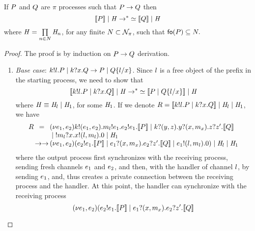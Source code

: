 \begin{lemma}\label{lem:oper-corresp-with-Hs-completeness}
If $P$ and $Q$ are $\pi$ processes such that  $P \rightarrow Q$ then 
\[
\llbracket P \rrbracket\;|\; \mathit{H} \rightarrow\negthickspace^* \simeq \llbracket Q \rrbracket\;|\; \mathit{H}
\]
where 
$\mathit{H}=\prod\limits_{n\in N} \mathit{H}_{n}$, for any finite $N\subset{\cal N}_\pi$, such that $\mathsf{fo}(P)\subseteq N.$
\end{lemma}
%
\begin{proof}
The proof is by induction on $P\rightarrow Q$ derivation.
\begin{enumerate}
\item \emph{Base case}: $k!l.P \;|\; k?x.Q \rightarrow P \;|\; Q\{l/x\}$. Since $l$ is a free object of the prefix in the starting process, we need to show that 
\[
\llbracket k!l.P \;|\; k?x.Q \rrbracket \;|\; \mathit{H} \rightarrow\negthickspace^* \simeq \llbracket P \;|\; Q\{l/x\} \rrbracket \;|\; \mathit{H} 
\]
where $\mathit{H}\equiv\mathit{H}_l \;|\;\mathit{H}_1$, for some $\mathit{H}_1$.
If we denote $R=\llbracket k!l.P \;|\; k?x.Q \rrbracket\;|\;  \mathit{H}_l \;|\;\mathit{H}_1$, we have  
\[
\begin{array}{l@{\,}c@{\,}l}
\PR 
& = & 
\rest{\NE_1,\NE_2} \send{\NK}\role\msg{(\NE_1,\NE_2)}.\send{\NM_\NL}\role\msg{\NE_1}.\send{\NE_2}\role\msg{\NE_1}.  \enc{ \PP }
\parop \receive\NK\role\msg{(\NY,\NZ)}.\receive\NY\role\msg{(\NX,\NM_\NX)}.\receive{\NZ}\role\msg{\NZ'}. \enc{\PQ} \\
%
& & \parop \rep\receive{\NM_\NL}\role\msg{\NX}.\send{\NX}\role\msg{(\NL,\NM_\NL)}.\inact  \parop \handler_1  \\
%
& \red\red & 
\rest{\NE_1,\NE_2} (\send{\NE_2}\role\msg{\NE_1}.  \enc{ \PP }
\parop \receive{\NE_1}\role\msg{(\NX,\NM_\NX)}.\receive{\NE_2}\role\msg{\NZ'}. \enc{\PQ} 
 \parop \send{\NE_1}\role\msg{(\NL,\NM_\NL)}.\inact ) \parop \handler_\NL \parop \handler_1 \\
%
%
\end{array}
\]
%
where the output process first synchronizes with the receiving process, sending fresh channels $e_1$ and $e_2$, and then, with the handler of channel $l$, by sending $e_1$, and, thus creates a private connection between the receiving process and the handler. 
At this point, the handler can synchronize with the receiving process
%
\[
(\nu e_1,e_2) (e_2!e_1.  \llbracket  P  \rrbracket
\;|\; e_1?(x,m_x).e_2?z'. \llbracket Q \rrbracket 
\]
\end{enumerate}
\end{proof}
